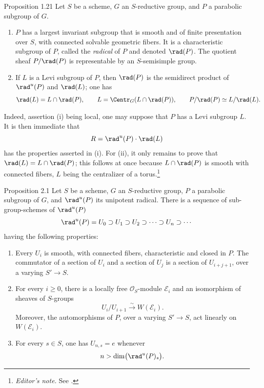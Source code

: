 \begin{sgastatement}{Proposition 1.21}
Let \(S\) be a scheme, \(G\) an \(S\)-reductive group, and \(P\) a
parabolic subgroup of \(G\).
\begin{enumerate}[label=\textup{(\roman*)}]
\item \(P\) has a largest invariant subgroup that is smooth and of finite
presentation over \(S\), with connected solvable geometric fibers.  It is
a characteristic subgroup of \(P\), called the \emph{radical} of \(P\)
and denoted \(\rad(P)\).  The quotient sheaf \(P/\rad(P)\) is representable
by an \(S\)-semisimple group.
\item If \(L\) is a Levi subgroup of \(P\), then \(\rad(P)\) is the
semidirect product of \(\rad^u(P)\) and \(\rad(L)\); one has
\[
 \rad(L)=L\cap\rad(P),
 \qquad
 L=\Centr_G(L\cap\rad(P)),
 \qquad
 P/\rad(P)\simeq L/\rad(L).
\]
\end{enumerate}
\end{sgastatement}

Indeed, assertion (i) being local, one may suppose that \(P\) has a Levi
subgroup \(L\).  It is then immediate that
\[
 R=\rad^u(P)\cdot\rad(L)
\]
has the properties asserted in (i).  For (ii), it only remains to prove
that \(\rad(L)=L\cap\rad(P)\); this follows at once because
\(L\cap\rad(P)\) is smooth with connected fibers, \(L\) being the
centralizer of a torus.\footnote{\emph{Editor's note.} See .}



\begin{sgastatement}{Proposition 2.1}
Let \(S\) be a scheme, \(G\) an \(S\)-reductive group, \(P\) a parabolic
subgroup of \(G\), and \(\rad^u(P)\) its unipotent radical.  There is a
sequence of sub-group-schemes of \(\rad^u(P)\)
\[
 \rad^u(P)=U_0\supset U_1\supset U_2\supset\cdots
 \supset U_n\supset\cdots
\]
having the following properties:
\begin{enumerate}[label=\textup{(\roman*)}]
\item Every \(U_i\) is smooth, with connected fibers, characteristic and
closed in \(P\).  The commutator of a section of \(U_i\) and a section of
\(U_j\) is a section of \(U_{i+j+1}\), over a varying \(S'\to S\).
\item For every \(i\geq0\), there is a locally free
\(\mathcal O_S\)-module \(\mathcal E_i\) and an isomorphism of sheaves of
\(S\)-groups
\[
 U_i/U_{i+1}\xrightarrow{\sim}W(\mathcal E_i).
\]
Moreover, the automorphisms of \(P\), over a varying \(S'\to S\), act
linearly on \(W(\mathcal E_i)\).
\item For every \(s\in S\), one has \(U_{n,s}=e\) whenever
\[
 n>\dim\bigl(\rad^u(P)_s\bigr).
\]
\end{enumerate}
\end{sgastatement}

